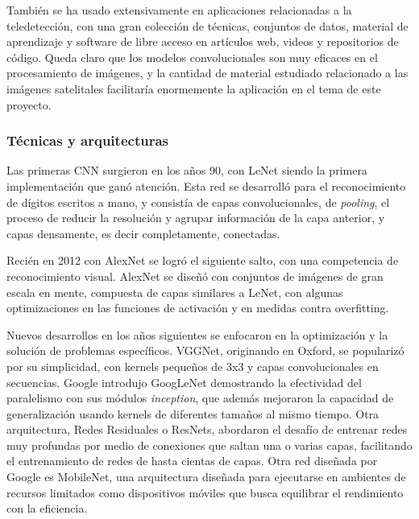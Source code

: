 También se ha usado extensivamente en aplicaciones relacionadas a la teledetección, con una gran colección de técnicas,
conjuntos de datos, material de aprendizaje y software de libre acceso en artículos web, videos y repositorios de
código. \autocite{tds-landuse-classification} \autocite{repo-satellite-image-dl} Queda claro que los modelos
convolucionales son muy eficaces en el procesamiento de imágenes, y la cantidad de material estudiado relacionado a las
imágenes satelitales facilitaría enormemente la aplicación en el tema de este proyecto.

\subsubsection{Técnicas y arquitecturas}

Las primeras CNN surgieron en los años 90, con LeNet siendo la primera implementación que ganó atención. Esta red se
desarrolló para el reconocimiento de dígitos escritos a mano, y consistía de capas convolucionales, de {\it pooling},
el proceso de reducir la resolución y agrupar información de la capa anterior, y capas densamente, es decir completamente, conectadas.

Recién en 2012 con AlexNet se logró el siguiente salto, con una competencia de reconocimiento visual. AlexNet se diseñó
con conjuntos de imágenes de gran escala en mente, compuesta de capas similares a LeNet, con algunas optimizaciones en
las funciones de activación y en medidas contra overfitting.

Nuevos desarrollos en los años siguientes se enfocaron en la optimización y la solución de problemas específicos.
VGGNet, originando en Oxford, se popularizó por su simplicidad, con kernels pequeños de 3x3 y capas convolucionales en
secuencias. Google introdujo GoogLeNet demostrando la efectividad del paralelismo con sus módulos {\it inception}, que
además mejoraron la capacidad de generalización usando kernels de diferentes tamaños al mismo tiempo. Otra
arquitectura, Redes Residuales o ResNets, abordaron el desafío de entrenar redes muy profundas por medio de conexiones
que saltan una o varias capas, facilitando el entrenamiento de redes de hasta cientas de capas. Otra red diseñada por
Google es MobileNet, una arquitectura diseñada para ejecutarse en ambientes de recursos limitados como dispositivos
móviles que busca equilibrar el rendimiento con la eficiencia.

